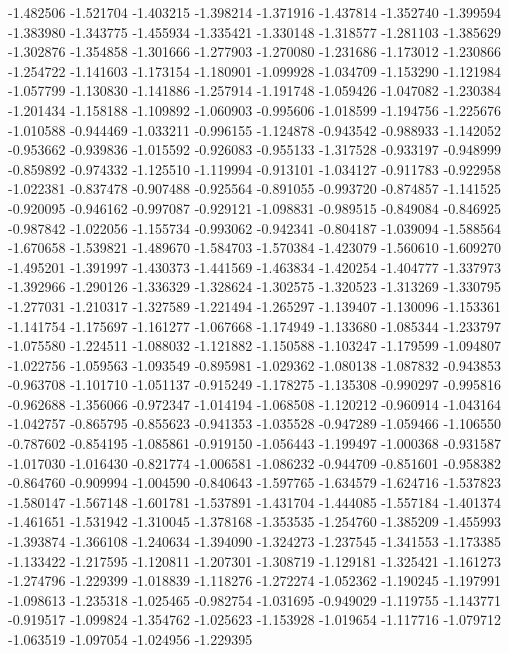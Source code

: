-1.482506
-1.521704
-1.403215
-1.398214
-1.371916
-1.437814
-1.352740
-1.399594
-1.383980
-1.343775
-1.455934
-1.335421
-1.330148
-1.318577
-1.281103
-1.385629
-1.302876
-1.354858
-1.301666
-1.277903
-1.270080
-1.231686
-1.173012
-1.230866
-1.254722
-1.141603
-1.173154
-1.180901
-1.099928
-1.034709
-1.153290
-1.121984
-1.057799
-1.130830
-1.141886
-1.257914
-1.191748
-1.059426
-1.047082
-1.230384
-1.201434
-1.158188
-1.109892
-1.060903
-0.995606
-1.018599
-1.194756
-1.225676
-1.010588
-0.944469
-1.033211
-0.996155
-1.124878
-0.943542
-0.988933
-1.142052
-0.953662
-0.939836
-1.015592
-0.926083
-0.955133
-1.317528
-0.933197
-0.948999
-0.859892
-0.974332
-1.125510
-1.119994
-0.913101
-1.034127
-0.911783
-0.922958
-1.022381
-0.837478
-0.907488
-0.925564
-0.891055
-0.993720
-0.874857
-1.141525
-0.920095
-0.946162
-0.997087
-0.929121
-1.098831
-0.989515
-0.849084
-0.846925
-0.987842
-1.022056
-1.155734
-0.993062
-0.942341
-0.804187
-1.039094
-1.588564
-1.670658
-1.539821
-1.489670
-1.584703
-1.570384
-1.423079
-1.560610
-1.609270
-1.495201
-1.391997
-1.430373
-1.441569
-1.463834
-1.420254
-1.404777
-1.337973
-1.392966
-1.290126
-1.336329
-1.328624
-1.302575
-1.320523
-1.313269
-1.330795
-1.277031
-1.210317
-1.327589
-1.221494
-1.265297
-1.139407
-1.130096
-1.153361
-1.141754
-1.175697
-1.161277
-1.067668
-1.174949
-1.133680
-1.085344
-1.233797
-1.075580
-1.224511
-1.088032
-1.121882
-1.150588
-1.103247
-1.179599
-1.094807
-1.022756
-1.059563
-1.093549
-0.895981
-1.029362
-1.080138
-1.087832
-0.943853
-0.963708
-1.101710
-1.051137
-0.915249
-1.178275
-1.135308
-0.990297
-0.995816
-0.962688
-1.356066
-0.972347
-1.014194
-1.068508
-1.120212
-0.960914
-1.043164
-1.042757
-0.865795
-0.855623
-0.941353
-1.035528
-0.947289
-1.059466
-1.106550
-0.787602
-0.854195
-1.085861
-0.919150
-1.056443
-1.199497
-1.000368
-0.931587
-1.017030
-1.016430
-0.821774
-1.006581
-1.086232
-0.944709
-0.851601
-0.958382
-0.864760
-0.909994
-1.004590
-0.840643
-1.597765
-1.634579
-1.624716
-1.537823
-1.580147
-1.567148
-1.601781
-1.537891
-1.431704
-1.444085
-1.557184
-1.401374
-1.461651
-1.531942
-1.310045
-1.378168
-1.353535
-1.254760
-1.385209
-1.455993
-1.393874
-1.366108
-1.240634
-1.394090
-1.324273
-1.237545
-1.341553
-1.173385
-1.133422
-1.217595
-1.120811
-1.207301
-1.308719
-1.129181
-1.325421
-1.161273
-1.274796
-1.229399
-1.018839
-1.118276
-1.272274
-1.052362
-1.190245
-1.197991
-1.098613
-1.235318
-1.025465
-0.982754
-1.031695
-0.949029
-1.119755
-1.143771
-0.919517
-1.099824
-1.354762
-1.025623
-1.153928
-1.019654
-1.117716
-1.079712
-1.063519
-1.097054
-1.024956
-1.229395
